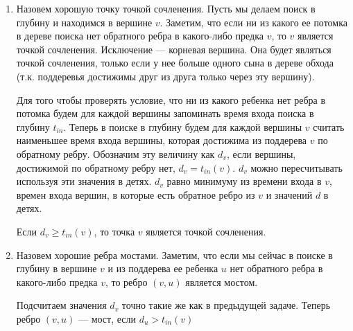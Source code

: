 \documentclass[10pt]{article}
\begin{document}
\begin{enumerate}
\item Назовем хорошую точку точкой сочленения. Пусть мы делаем поиск в глубину и находимся в вершине $v$. Заметим, что если ни из какого ее потомка в дереве поиска нет обратного ребра в какого-либо предка $v$, то $v$ является точкой сочленения. Исключение --- корневая вершина. Она будет являться точкой сочленения, только если у нее больше одного сына в дереве обхода (т.к. поддеревья достижимы друг из друга только через эту вершину). 

Для того чтобы проверять условие, что ни из какого ребенка нет ребра в потомка будем для каждой вершины запоминать время входа поиска в глубину $t_{in}$. Теперь в поиске в глубину будем для каждой вершины $v$ считать наименьшее время входа вершины, которая достижима из поддерева $v$ по обратному ребру. Обозначим эту величину как $d_v$, если вершины, достижимой по обратному ребру нет, $d_v = t_{in}(v)$. $d_v$ можно пересчитывать используя эти значения в детях. $d_v$ равно минимуму из времени входа в $v$, времен входа вершин, в которые есть обратное ребро из $v$ и значений $d$ в детях.

Если $d_v \ge t_{in}(v)$, то точка $v$ является точкой сочленения.

\item Назовем хорошие ребра мостами. Заметим, что если мы сейчас в поиске в глубину в вершине $v$ и из поддерева ее ребенка $u$ нет обратного ребра в какого-либо предка $v$, то ребро $(v, u)$ является мостом.

Подсчитаем значения $d_v$ точно такие же как в предыдущей задаче. Теперь ребро $(v, u)$ --- мост, если $d_u > t_{in}(v)$

\end{enumerate}
\end{document}
